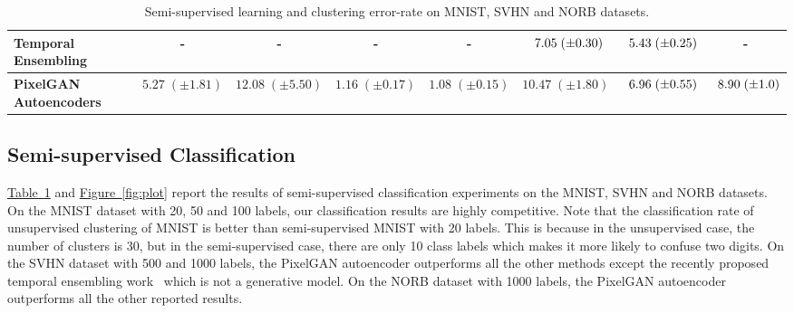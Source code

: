 \documentclass{article}
\newcommand{\mytable}[1]{\hyperref[table:#1]{Table~\ref*{table:#1}}}
\newcommand{\myfig}[1]{\hyperref[fig:#1]{Figure~\ref*{fig:#1}}}
\begin{document}
\begin{center}
\begin{table}[t]
{\begin{tabular}{l|cccc|cc|c}
Temporal Ensembling~\citep{temporal-ensembling} & -                   &-                  & -                 & -                   & $\hspace{.5em}7.05\;(\pm 0.30)$ & $\hspace{.5em}5.43\;(\pm 0.25)$   & -                                \\     
\midrule
\textbf{PixelGAN Autoencoders}                  & $5.27\;(\pm 1.81)$  &$12.08\;(\pm 5.50)$& $1.16\;(\pm 0.17)$& $1.08\;(\pm 0.15)$  & $10.47\;(\pm 1.80)$             & $\hspace{.5em}6.96\;(\pm 0.55)$   & $\hspace{.5em}8.90\;(\pm 1.0)$   \\
  \bottomrule
\end{tabular}
}
\vspace{.1ex}
\caption{\label{table:semi}Semi-supervised learning and clustering error-rate on MNIST, SVHN and NORB datasets.}
\end{table}
\end{center}

\subsection{Semi-supervised Classification}\label{sec:experiments:semi}
\mytable{semi} and \myfig{plot} report the results of semi-supervised classification experiments on the MNIST, SVHN and NORB datasets. On the MNIST dataset with 20, 50 and 100 labels, our classification results are highly competitive.
Note that the classification rate of unsupervised clustering of MNIST is better than semi-supervised MNIST with 20 labels. This is because in the unsupervised case, the number of clusters is 30, but in the semi-supervised case, there are only 10 class labels which makes it more likely to confuse two digits. 
On the SVHN dataset with 500 and 1000 labels, the PixelGAN autoencoder outperforms all the other methods except the recently proposed temporal ensembling work~\citep{temporal-ensembling} which is not a generative model.
On the NORB dataset with 1000 labels, the PixelGAN autoencoder outperforms all the other reported results.
\end{document}
